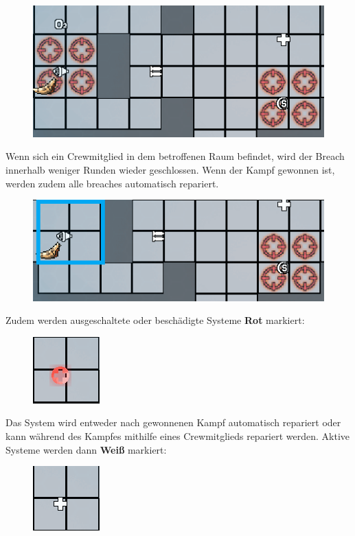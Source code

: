 \documentclass[fontsize=12pt,paper=a4,twoside]{scrartcl}
\begin{document}
\begin{figure}[H]
\centering
\includegraphics[width=0.7\linewidth]{DasSpiel/Ui/breach.png}
\end{figure}

Wenn sich ein Crewmitglied in dem betroffenen Raum befindet, wird der Breach innerhalb weniger Runden wieder geschlossen. Wenn der Kampf gewonnen ist, werden zudem alle breaches automatisch repariert.

\begin{figure}[H]
\centering
\includegraphics[width=0.7\linewidth]{DasSpiel/Ui/breach2.png}
\end{figure}

Zudem werden ausgeschaltete oder beschädigte Systeme \textbf{Rot} markiert:

\begin{figure}[H]
\centering
\includegraphics[width=0.2\linewidth]{DasSpiel/Ui/system_off.png}
\end{figure}



Das System wird entweder nach gewonnenen Kampf automatisch repariert oder kann während des Kampfes mithilfe eines Crewmitglieds repariert werden. Aktive Systeme werden dann \textbf{Weiß} markiert:

\begin{figure}[H]
\centering
\includegraphics[width=0.2\linewidth]{DasSpiel/Ui/heal_on2.png}
\end{figure}
\end{document}
